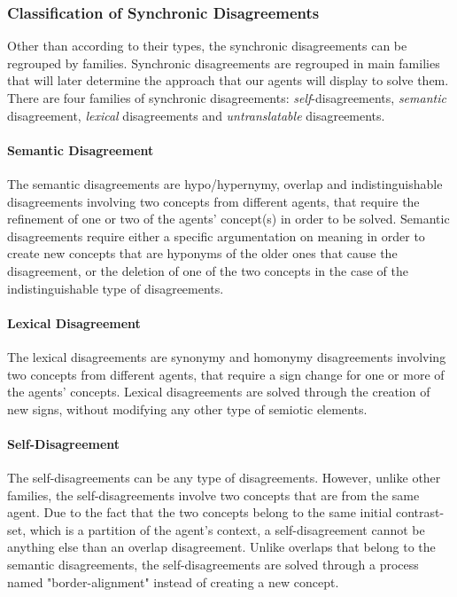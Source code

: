 \subsubsection{Classification of Synchronic Disagreements}\label{sec:SynDclass}

Other than according to their types, the synchronic disagreements can be regrouped by families. Synchronic disagreements are regrouped in main families that will later determine the approach that our agents will display to solve them. There are four families of synchronic disagreements: \emph{self}-disagreements, \emph{semantic} disagreement, \emph{lexical} disagreements and \emph{untranslatable} disagreements.

\paragraph{Semantic Disagreement} The semantic disagreements are hypo/hypernymy, overlap and indistinguishable disagreements involving two concepts from different agents, that require the refinement of one or two of the agents' concept(s) in order to be solved. Semantic disagreements require either a specific argumentation on meaning in order to create new concepts that are hyponyms of the older ones that cause the disagreement, or the deletion of one of the two concepts in the case of the indistinguishable type of disagreements.

\paragraph{Lexical Disagreement} The lexical disagreements are synonymy and homonymy disagreements involving two concepts from different agents, that require a sign change for one or more of the agents' concepts. Lexical disagreements are solved through the creation of new signs, without modifying any other type of semiotic elements.

\paragraph{Self-Disagreement} The self-disagreements can be any type of disagreements. However, unlike other families, the self-disagreements involve two concepts that are from the same agent. Due to the fact that the two concepts belong to the same initial contrast-set, which is a partition of the agent's context, a self-disagreement cannot be anything else than an overlap disagreement. Unlike overlaps that belong to the semantic disagreements, the self-disagreements are solved through a process named "border-alignment" instead of creating a new concept.

